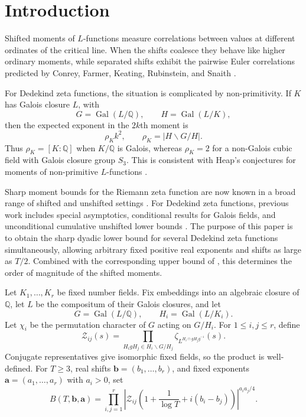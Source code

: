 \documentclass[11pt]{amsart}
\numberwithin{equation}{section}
\theoremstyle{plain}
\newcommand{\Q}{\mathbb{Q}}
\newcommand{\calZ}{\mathcal{Z}}
\renewcommand{\le}{\leqslant}
\renewcommand{\ge}{\geqslant}
\DeclareMathOperator{\Gal}{Gal}
\begin{document}
\section{Introduction}\label{sec:introduction}

Shifted moments of $L$-functions measure correlations between values at
different ordinates of the critical line.  When the shifts coalesce they
behave like higher ordinary moments, while separated shifts exhibit the
pairwise Euler correlations predicted by Conrey, Farmer, Keating,
Rubinstein, and Snaith \cite{CFKRS}.

For Dedekind zeta functions, the situation is complicated by
non-primitivity.  If $K$ has Galois closure $L$, with
$$
G=\Gal(L/\Q),\qquad H=\Gal(L/K),
$$
then the expected exponent in the $2k$th moment is
$$
\rho_K k^2,\qquad \rho_K=|H\backslash G/H|.
$$
Thus $\rho_K=[K:\Q]$ when $K/\Q$ is Galois, whereas $\rho_K=2$ for a
non-Galois cubic field with Galois closure group $S_3$.  This is consistent
with Heap's conjectures for moments of non-primitive $L$-functions
\cite{HeapDedekind}.

Sharp moment bounds for the Riemann zeta function are now known in a broad
range of shifted and unshifted settings
\cite{Soundararajan,Harper,Chandee,NgShenWong,CurranCorrelation,
RadziwillSoundararajan,HeapSoundararajan,CurranLower}.  For Dedekind zeta
functions, previous work includes special asymptotics, conditional results
for Galois fields, and unconditional cumulative unshifted lower bounds
\cite{Motohashi,MilinovichTurnageButterbaugh,Hagen,AkbaryFodden,Sono,
Krishnamoorthy}.  The purpose of this paper is to obtain the sharp dyadic
lower bound for several Dedekind zeta functions simultaneously, allowing
arbitrary fixed positive real exponents and shifts as large as $T/2$.
Combined with the corresponding upper bound of
\cite{DurkanKarakMahatab}, this determines the order of magnitude of the
shifted moments.

Let $K_1,\ldots,K_r$ be fixed number fields.  Fix embeddings into an
algebraic closure of $\Q$, let $L$ be the compositum of their Galois
closures, and let
$$
G=\Gal(L/\Q),\qquad H_i=\Gal(L/K_i).
$$
Let $\chi_i$ be the permutation character of $G$ acting on $G/H_i$.  For
$1\le i,j\le r$, define
\begin{equation}\label{eq:double-coset-zeta}
\calZ_{ij}(s)=
\prod_{H_i gH_j\in H_i\backslash G/H_j}
\zeta_{L^{H_i\cap gH_jg^{-1}}}(s).
\end{equation}
Conjugate representatives give isomorphic fixed fields, so the product is
well-defined.  For $T\ge3$, real shifts
$\mathbf b=(b_1,\ldots,b_r)$, and fixed exponents
$\mathbf a=(a_1,\ldots,a_r)$ with $a_i>0$, set
\begin{equation}\label{eq:B-definition}
B(T,\mathbf b,\mathbf a)=
\prod_{i,j=1}^r
\left|
\calZ_{ij}\left(1+\frac{1}{\log T}+i(b_i-b_j)\right)
\right|^{a_i a_j/4}.
\end{equation}
\end{document}
